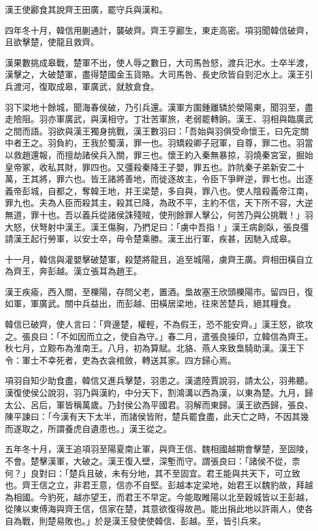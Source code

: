 \begin{pinyinscope}
漢王使酈食其說齊王田廣，罷守兵與漢和。

四年冬十月，韓信用蒯通計，襲破齊。齊王亨酈生，東走高密。項羽聞韓信破齊，且欲擊楚，使龍且救齊。

漢果數挑成皋戰，楚軍不出，使人辱之數日，大司馬咎怒，渡兵汜水。士卒半渡，漢擊之，大破楚軍，盡得楚國金玉貨賂。大司馬咎、長史欣皆自剄汜水上。漢王引兵渡河，復取成皋，軍廣武，就敖倉食。

羽下梁地十餘城，聞海春侯破，乃引兵還。漢軍方圍鍾離辚於滎陽東，聞羽至，盡走險阻。羽亦軍廣武，與漢相守。丁壯苦軍旅，老弱罷轉餉。漢王、羽相與臨廣武之間而語。羽欲與漢王獨身挑戰，漢王數羽曰：「吾始與羽俱受命懷王，曰先定關中者王之。羽負約，王我於蜀漢，罪一也。羽矯殺卿子冠軍，自尊，罪二也。羽當以救趙還報，而擅劫諸侯兵入關，罪三也。懷王約入秦無暴掠，羽燒秦宮室，掘始皇帝冢，收私其財，罪四也。又彊殺秦降王子嬰，罪五也。詐阬秦子弟新安二十萬，王其將，罪六也。皆王諸將善地，而徙逐故主，令臣下爭畔逆，罪七也。出逐義帝彭城，自都之，奪韓王地，并王梁楚，多自與，罪八也。使人陰殺義帝江南，罪九也。夫為人臣而殺其主，殺其已降，為政不平，主約不信，天下所不容，大逆無道，罪十也。吾以義兵從諸侯誅殘賊，使刑餘罪人擊公，何苦乃與公挑戰！」羽大怒，伏弩射中漢王。漢王傷胸，乃捫足曰：「虜中吾指！」漢王病創臥，張良彊請漢王起行勞軍，以安士卒，毋令楚乘勝。漢王出行軍，疾甚，因馳入成皋。

十一月，韓信與灌嬰擊破楚軍，殺楚將龍且，追至城陽，虜齊王廣。齊相田橫自立為齊王，奔彭越。漢立張耳為趙王。

漢王疾瘉，西入關，至櫟陽，存問父老，置酒。梟故塞王欣頭櫟陽市。留四日，復如軍，軍廣武。關中兵益出，而彭越、田橫居梁地，往來苦楚兵，絕其糧食。

韓信已破齊，使人言曰：「齊邊楚，權輕，不為假王，恐不能安齊。」漢王怒，欲攻之。張良曰：「不如因而立之，使自為守。」春二月，遣張良操印，立韓信為齊王。秋七月，立黥布為淮南王。八月，初為算賦。北貉、燕人來致梟騎助漢。漢王下令：軍士不幸死者，吏為衣衾棺斂，轉送其家。四方歸心焉。

項羽自知少助食盡，韓信又進兵擊楚，羽患之。漢遣陸賈說羽，請太公，羽弗聽。漢復使侯公說羽，羽乃與漢約，中分天下，割鴻溝以西為漢，以東為楚。九月，歸太公、呂后，軍皆稱萬歲。乃封侯公為平國君。羽解而東歸。漢王欲西歸，張良、陳平諫曰：「今漢有天下太半，而諸侯皆附，楚兵罷食盡，此天亡之時，不因其幾而遂取之，所謂養虎自遺患也。」漢王從之。

五年冬十月，漢王追項羽至陽夏南止軍，與齊王信、魏相國越期會擊楚，至固陵，不會。楚擊漢軍，大破之。漢王復入壁，深塹而守。謂張良曰：「諸侯不從，柰何？」良對曰：「楚兵且破，未有分地，其不至固宜。君王能與共天下，可立致也。齊王信之立，非君王意，信亦不自堅。彭越本定梁地，始君王以魏豹故，拜越為相國。今豹死，越亦望王，而君王不早定。今能取睢陽以北至穀城皆以王彭越，從陳以東傅海與齊王信，信家在楚，其意欲復得故邑。能出捐此地以許兩人，使各自為戰，則楚易敗也。」於是漢王發使使韓信、彭越。至，皆引兵來。


\end{pinyinscope}

